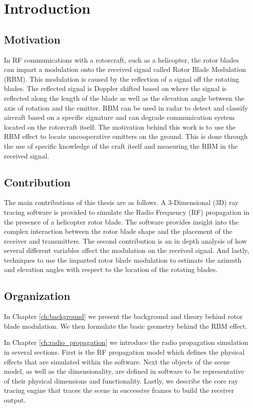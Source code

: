 \chapter{Introduction}

\section{Motivation}
In RF communications with a rotorcraft, such as a helicopter, the rotor blades can impart a modulation onto the received signal called Rotor Blade Modulation (RBM). This modulation is caused by the reflection of a signal off the rotating blades. The reflected signal is Doppler shifted based on where the signal is reflected along the length of the blade as well as the elevation angle between the axis of rotation and the emitter. RBM can be used in radar to detect and classify aircraft based on a specific signature and can degrade communication system located on the rotorcraft itself. The motivation behind this work is to use the RBM effect to locate uncooperative emitters on the ground. This is done through the use of specific knowledge of the craft itself and measuring the RBM in the received signal.

\section{Contribution}
The main contributions of this thesis are as follows. A 3-Dimensional (3D) ray tracing software is provided to simulate the Radio Frequency (RF) propagation in the presence of a helicopter rotor blade. The software provides insight into the complex interaction between the rotor blade shape and the placement of the receiver and transmitters. The second contribution is an in depth analysis of how several different variables affect the modulation on the received signal. And lastly, techniques to use the imparted rotor blade modulation to estimate the azimuth and elevation angles with respect to the location of the rotating blades.

\section{Organization}
In Chapter \ref{ch:background} we present the background and theory behind rotor blade modulation. We then formulate the basic geometry behind the RBM effect.

In Chapter \ref{ch:radio_propagation} we introduce the radio propagation simulation in several sections. First is the RF propagation model which defines the physical effects that are simulated within the software. Next the objects of the scene model, as well as the dimensionality, are defined in software to be representative of their physical  dimensions and functionality. Lastly, we describe the core ray tracing engine that traces the scene in successive frames to build the receiver output.

